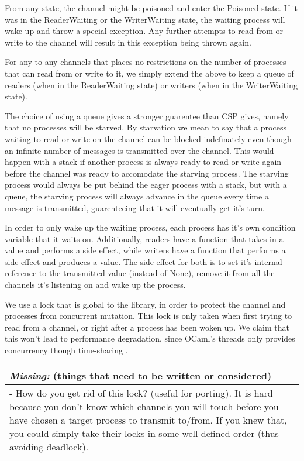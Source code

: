 \documentclass[a4paper,12pt]{article}
\newcommand{\missing}[1]{
  \begin{tabular}{|p{11cm}|}
    \hline
    \emph{Missing:} {\scriptsize (things that need to be written or considered)} \\
    \hline
    #1
    \hline
  \end{tabular}
}
\begin{document}
From any state, the channel might be poisoned and enter the Poisoned state. If it was in the
ReaderWaiting or the WriterWaiting state, the waiting process will wake up and throw a special
exception. Any further attempts to read from or write to the channel will result in this 
exception being thrown again.

For any to any channels that places no restrictions on the number of processes that can read
from or write to it, we simply extend the above to keep a queue of readers (when in the 
ReaderWaiting state) or writers (when in the WriterWaiting state).

The choice of using a queue gives a stronger guarentee than CSP gives, namely that no processes
will be starved. By starvation we mean to say that a process waiting to read or write on the
channel can be blocked indefinately even though an infinite number of messages is transmitted
over the channel. This would happen with a stack if another process is always ready to read or 
write again before the channel was ready to accomodate the starving process. The starving process
would always be put behind the eager process with a stack, but with a queue, the starving process
will always advance in the queue every time a message is transmitted, guarenteeing that it will
eventually get it's turn.

In order to only wake up the waiting process, each process has it's own condition variable that
it waits on. Additionally, readers have a function that takes in a value and performs a side 
effect, while writers have a function that performs a side effect and produces a value. The side
effect for both is to set it's internal reference to the transmitted value (instead of None),
remove it from all the channels it's listening on and wake up the process.

We use a lock that is global to the library, in order to protect the channel and processes from
concurrent mutation. This lock is only taken when first trying to read from a channel, or
right after a process has been woken up. We claim that this won't lead to performance degradation,
since OCaml's threads only provides concurrency though time-sharing \cite{ocaml-threads}.

\missing{
- How do you get rid of this lock? (useful for porting). It is hard because you don't know which
channels you will touch before you have chosen a target process to transmit to/from. If you knew
that, you could simply take their locks in some well defined order (thus avoiding deadlock). \\
}
\end{document}
